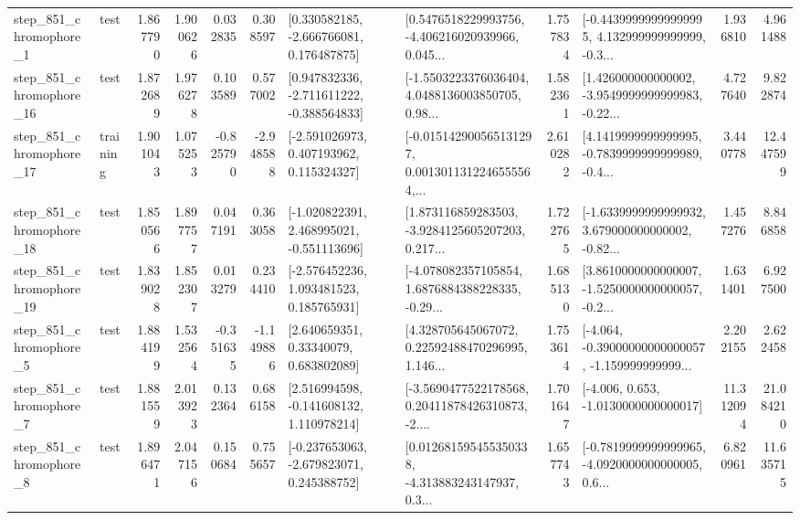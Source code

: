 \begin{tabular}{llrrrrllrlrr}
   step\_851\_chromophore\_1 &      test &      1.867790 &    1.900626 &      0.032835 &  0.308597 &    [0.330582185, -2.666766081, 0.176487875] &  [0.5476518229993756, -4.406216020939966, 0.045... &       1.757834 &  [-0.44399999999999995, 4.132999999999999, -0.3... &            1.936810 &          4.961488 \\
  step\_851\_chromophore\_16 &      test &      1.872689 &    1.976278 &      0.103589 &  0.577002 &   [0.947832336, -2.711611222, -0.388564833] &  [-1.5503223376036404, 4.0488136003850705, 0.98... &       1.582361 &  [1.426000000000002, -3.9549999999999983, -0.22... &            4.727640 &          9.822874 \\
  step\_851\_chromophore\_17 &  training &      1.901043 &    1.075253 &     -0.825790 & -2.948588 &    [-2.591026973, 0.407193962, 0.115324327] &  [-0.015142900565131297, 0.0013011312246555564,... &       2.610282 &  [4.1419999999999995, -0.7839999999999989, -0.4... &            3.440778 &         12.447599 \\
  step\_851\_chromophore\_18 &      test &      1.850566 &    1.897757 &      0.047191 &  0.363058 &   [-1.020822391, 2.468995021, -0.551113696] &  [1.873116859283503, -3.9284125605207203, 0.217... &       1.722765 &  [-1.6339999999999932, 3.679000000000002, -0.82... &            1.457276 &          8.846858 \\
  step\_851\_chromophore\_19 &      test &      1.839028 &    1.852307 &      0.013279 &  0.234410 &    [-2.576452236, 1.093481523, 0.185765931] &  [-4.078082357105854, 1.6876884388228335, -0.29... &       1.685130 &  [3.8610000000000007, -1.5250000000000057, -0.2... &            1.631401 &          6.927500 \\
   step\_851\_chromophore\_5 &      test &      1.884199 &    1.532564 &     -0.351635 & -1.149886 &      [2.640659351, 0.33340079, 0.683802089] &  [4.328705645067072, 0.22592488470296995, 1.146... &       1.753614 &  [-4.064, -0.39000000000000057, -1.159999999999... &            2.202155 &          2.622458 \\
   step\_851\_chromophore\_7 &      test &      1.881559 &    2.013923 &      0.132364 &  0.686158 &    [2.516994598, -0.141608132, 1.110978214] &  [-3.5690477522178568, 0.20411878426310873, -2.... &       1.701647 &               [-4.006, 0.653, -1.0130000000000017] &           11.312094 &         21.084210 \\
   step\_851\_chromophore\_8 &      test &      1.896471 &    2.047156 &      0.150684 &  0.755657 &   [-0.237653063, -2.679823071, 0.245388752] &  [0.012681595455350338, -4.313883243147937, 0.3... &       1.657743 &  [-0.7819999999999965, -4.0920000000000005, 0.6... &            6.820961 &         11.635715 \\

\end{tabular}
